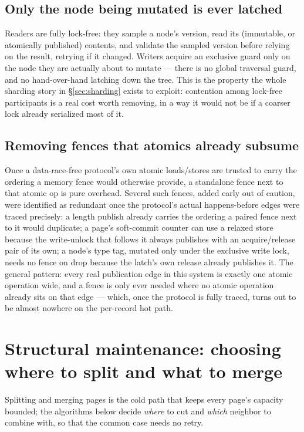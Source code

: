 \documentclass[11pt]{article}
\begin{document}
\subsection{Only the node being mutated is ever latched}

Readers are fully lock-free: they sample a node's version, read its (immutable, or
atomically published) contents, and validate the sampled version before relying on
the result, retrying if it changed. Writers acquire an exclusive guard only on the
node they are actually about to mutate --- there is no global traversal guard, and
no hand-over-hand latching down the tree. This is the property the whole sharding
story in \S\ref{sec:sharding} exists to exploit: contention among lock-free
participants is a real cost worth removing, in a way it would not be if a coarser
lock already serialized most of it.

\subsection{Removing fences that atomics already subsume}

Once a data-race-free protocol's own atomic loads/stores are trusted to carry the
ordering a memory fence would otherwise provide, a standalone fence next to that
atomic op is pure overhead. Several such fences, added early out of caution, were
identified as redundant once the protocol's actual happens-before edges were traced
precisely: a length publish already carries the ordering a paired fence next to it
would duplicate; a page's soft-commit counter can use a relaxed store because the
write-unlock that follows it always publishes with an acquire/release pair of its
own; a node's type tag, mutated only under the exclusive write lock, needs no fence
on drop because the latch's own release already publishes it. The general pattern:
every real publication edge in this system is exactly one atomic operation wide, and
a fence is only ever needed where no atomic operation already sits on that edge ---
which, once the protocol is fully traced, turns out to be almost nowhere on the
per-record hot path.

\section{Structural maintenance: choosing where to split and what to merge}
\label{sec:smo}

Splitting and merging pages is the cold path that keeps every page's capacity
bounded; the algorithms below decide \emph{where} to cut and \emph{which} neighbor
to combine with, so that the common case needs no retry.
\end{document}
